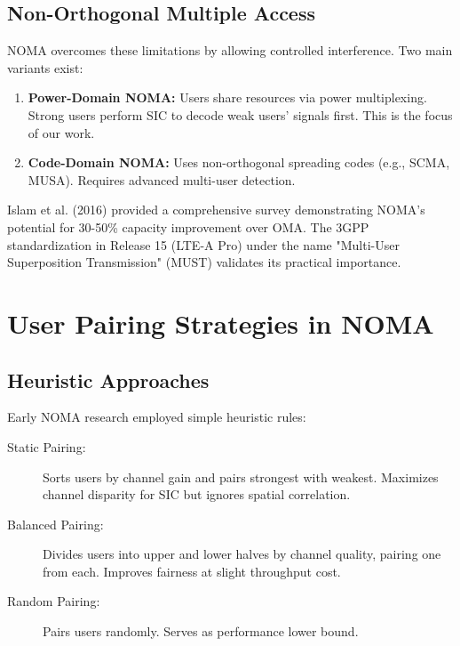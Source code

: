 \subsection{Non-Orthogonal Multiple Access}

NOMA overcomes these limitations by allowing controlled interference. Two main variants exist:

\begin{enumerate}
    \item \textbf{Power-Domain NOMA:} Users share resources via power multiplexing. Strong users perform SIC to decode weak users' signals first. This is the focus of our work.
    
    \item \textbf{Code-Domain NOMA:} Uses non-orthogonal spreading codes (e.g., SCMA, MUSA). Requires advanced multi-user detection.
\end{enumerate}

Islam et al. (2016) \cite{islam2016} provided a comprehensive survey demonstrating NOMA's potential for 30-50\% capacity improvement over OMA. The 3GPP standardization in Release 15 (LTE-A Pro) under the name "Multi-User Superposition Transmission" (MUST) validates its practical importance.

\section{User Pairing Strategies in NOMA}

\subsection{Heuristic Approaches}

Early NOMA research employed simple heuristic rules:

\begin{description}
    \item[Static Pairing:] Sorts users by channel gain and pairs strongest with weakest. Maximizes channel disparity for SIC but ignores spatial correlation.
    
    \item[Balanced Pairing:] Divides users into upper and lower halves by channel quality, pairing one from each. Improves fairness at slight throughput cost.
    
    \item[Random Pairing:] Pairs users randomly. Serves as performance lower bound.
\end{description}

